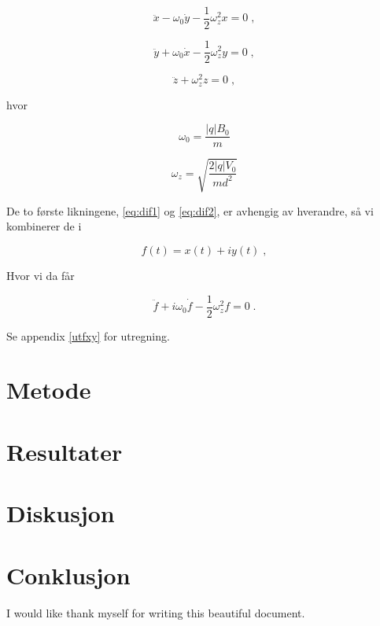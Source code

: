 \documentclass[reprint,english,notitlepage, nofootinbib]{revtex4-1}  %
\begin{document}
\begin{equation} \label{eq:dif1}
\ddot{x} - \omega_0 \dot{y} - \frac{1}{2}\omega_z^2 x = 0 \; ,
\end{equation}

\begin{equation}\label{eq:dif2}
\ddot{y} + \omega_0 \dot{x} - \frac{1}{2}\omega_z^2 y = 0 \; ,
\end{equation}

\begin{equation}\label{eq:dif3}
\ddot{z} + \omega_z^2 z = 0 \; ,
\end{equation}

hvor


$$\omega_0 = \frac{|q|B_0}{m}$$

$$ \omega_z = \sqrt{\frac{2|q|V_0}{md^2}}$$

De to første likningene, \ref{eq:dif1} og \ref{eq:dif2}, er avhengig av hverandre, så vi kombinerer de i

$$
f(t) = x(t) + iy(t) \; ,
$$

Hvor vi da får 

\begin{equation}\label{fxy}
\ddot{f} + i\omega_0 \dot{f} - \frac{1}{2} \omega_z^2 f = 0 \; .
\end{equation}

Se appendix \ref{utfxy} for utregning. 
\section{Metode}
\section{Resultater}
\section{Diskusjon}
\section{Conklusjon}
\begin{acknowledgments}  %
I would like thank myself for writing this beautiful document.
\end{acknowledgments}


\end{document}

